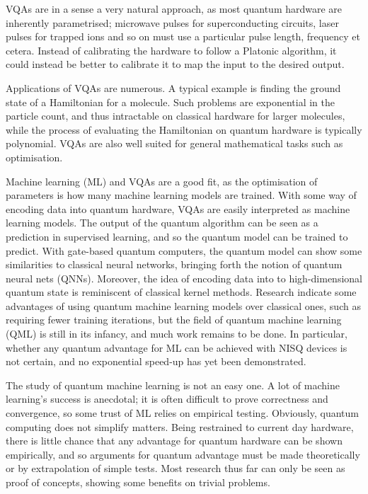 VQAs are in a sense a very natural approach, as most quantum hardware are inherently parametrised; microwave pulses for superconducting circuits, laser pulses for trapped ions and so on must use a particular pulse length, frequency et cetera.
Instead of calibrating the hardware to follow a Platonic algorithm, it could instead be better to calibrate it to map the input to the desired output.

Applications of VQAs are numerous.
A typical example is finding the ground state of a Hamiltonian for a molecule.
Such problems are exponential in the particle count, and thus intractable on classical hardware for larger molecules, while the process of evaluating the Hamiltonian on quantum hardware is typically polynomial.
VQAs are also well suited for general mathematical tasks such as optimisation.

Machine learning (ML) and VQAs are a good fit, as the optimisation of parameters is how many machine learning models are trained.
With some way of encoding data into quantum hardware, VQAs are easily interpreted as machine learning models.
The output of the quantum algorithm can be seen as a prediction in supervised learning, and so the quantum model can be trained to predict.
With gate-based quantum computers, the quantum model can show some similarities to classical neural networks, bringing forth the notion of quantum neural nets (QNNs).
Moreover, the idea of encoding data into to high-dimensional quantum state is reminiscent of classical kernel methods.
Research indicate some advantages of using quantum machine learning models over classical ones, such as requiring fewer training iterations, but the field of quantum machine learning (QML) is still in its infancy, and much work remains to be done.
In particular, whether any quantum advantage for ML can be achieved with NISQ devices is not certain, and no exponential speed-up has yet been demonstrated.

The study of quantum machine learning is not an easy one.
A lot of machine learning's success is anecdotal; it is often difficult to prove correctness and convergence, so some trust of ML relies on empirical testing.
Obviously, quantum computing does not simplify matters.
Being restrained to current day hardware, there is little chance that any advantage for quantum hardware can be shown empirically, and so arguments for quantum advantage must be made theoretically or by extrapolation of simple tests.
Most research thus far can only be seen as proof of concepts, showing some benefits on trivial problems.

